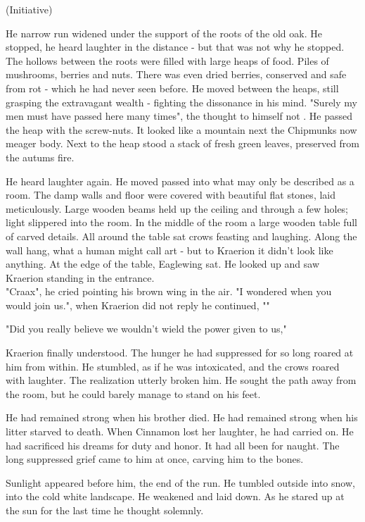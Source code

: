 (Initiative)

He narrow run widened under the support of the roots of the old oak. He stopped, he heard laughter in the distance - but that was not why he stopped. The hollows between the roots were filled with large heaps of food. Piles of mushrooms, berries and nuts. There was even dried berries, conserved and safe from rot - which he had never seen before. He moved between the heaps, still grasping the extravagant wealth - fighting the dissonance in his mind. "Surely my men must have passed here many times", the thought to himself not . He passed the heap with the screw-nuts. It looked like a mountain next the Chipmunks now meager body. Next to the heap stood a stack of fresh green leaves, preserved from the autums fire.

He heard laughter again. He moved passed into what may only be described as a room. The damp walls and floor were covered with beautiful flat stones, laid meticulously. Large wooden beams held up the ceiling and through a few holes; light slippered into the room. In the middle of the room a large wooden table full of carved details. All around the table sat crows feasting and laughing. Along the wall hang, what a human might call art - but to Kraerion it didn't look like anything. At the edge of the table, Eaglewing sat. He looked up and saw Kraerion standing in the entrance.\\

"Craax", he cried pointing his brown wing in the air. "I wondered when you would join us.", when Kraerion did not reply he continued, ""


"Did you really believe we wouldn't wield the power given to us,"

Kraerion finally understood. The hunger he had suppressed for so long roared at him from within. He stumbled, as if he was intoxicated, and the crows roared with laughter. The realization utterly broken him. He sought the path away from the room, but he could barely manage to stand on his feet.

He had remained strong when his brother died. He had remained strong when his litter starved to death. When Cinnamon lost her laughter, he had carried on. He had sacrificed his dreams for duty and honor. It had all been for naught. The long suppressed grief came to him at once, carving him to the bones.

Sunlight appeared before him, the end of the run. He tumbled outside into snow, into the cold white landscape. He weakened and laid down. As he stared up at the sun for the last time he thought solemnly.

